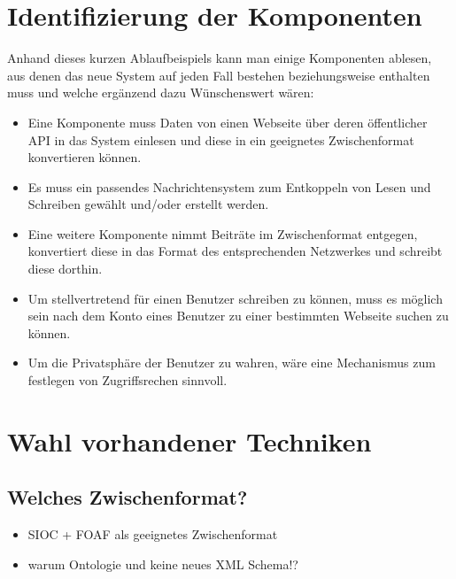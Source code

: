 \section{Identifizierung der Komponenten} %
\label{sec:identifizierung_der_komponenten}

Anhand dieses kurzen Ablaufbeispiels kann man einige Komponenten ablesen, aus denen das neue System auf jeden Fall bestehen beziehungsweise enthalten muss und welche ergänzend dazu Wünschenswert wären:

\begin{itemize} 
    \item Eine Komponente muss Daten von einen Webseite über deren öffentlicher API in das System einlesen und diese in ein geeignetes Zwischenformat konvertieren können.
    \item Es muss ein passendes Nachrichtensystem zum Entkoppeln von Lesen und Schreiben gewählt und/oder erstellt werden.
    \item Eine weitere Komponente nimmt Beiträte im Zwischenformat entgegen, konvertiert diese in das Format des entsprechenden Netzwerkes und schreibt diese dorthin.
    \item Um stellvertretend für einen Benutzer schreiben zu können, muss es möglich sein nach dem Konto eines Benutzer zu einer bestimmten Webseite suchen zu können.
    \item Um die Privatsphäre der Benutzer zu wahren, wäre eine Mechanismus zum festlegen von Zugriffsrechen sinnvoll.
\end{itemize}   


\section{Wahl vorhandener Techniken} %
\label{sec:wahl_vorhandener_techniken}


\subsection{Welches Zwischenformat?} %
\label{sub:welches_zwischenformat}

\begin{itemize}
    \item SIOC + FOAF  als geeignetes Zwischenformat
    \item warum Ontologie und keine neues XML Schema!?
\end{itemize}

